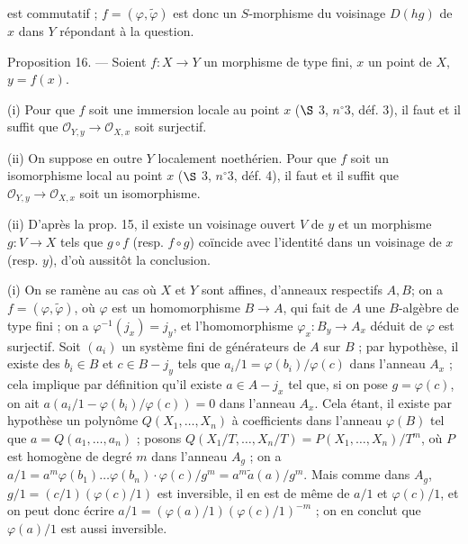 \newpage


est commutatif ; $f = (\varphi, \tilde{\varphi})$ est donc un $S$-morphisme du voisinage $D(hg)$ de $x$ dans $Y$ répondant à la question.

Proposition 16. — Soient $f: X \to Y$ un morphisme de type fini, $x$ un point de $X$, $y = f(x)$.

(i) Pour que $f$ soit une immersion locale au point $x$ ($\S$ 3, $n^\circ 3$, déf. 3), il faut et il suffit que $\mathcal{O}_{Y,y} \to \mathcal{O}_{X,x}$ soit surjectif.

(ii) On suppose en outre $Y$ localement noethérien. Pour que $f$ soit un isomorphisme local au point $x$ ($\S$ 3, $n^\circ 3$, déf. 4), il faut et il suffit que $\mathcal{O}_{Y,y} \to \mathcal{O}_{X,x}$ soit un isomorphisme.

(ii) D'après la prop. 15, il existe un voisinage ouvert $V$ de $y$ et un morphisme $g: V \to X$ tels que $g \circ f$ (resp. $f \circ g$) coïncide avec l'identité dans un voisinage de $x$ (resp. $y$), d'où aussitôt la conclusion.

(i) On se ramène au cas où $X$ et $Y$ sont affines, d'anneaux respectifs $A, B$; on a $f = (\varphi, \tilde{\varphi})$, où $\varphi$ est un homomorphisme $B \to A$, qui fait de $A$ une $B$-algèbre de type fini ; on a $\varphi^{-1}(j_x) = j_y$, et l'homomorphisme $\varphi_x : B_y \to A_x$ déduit de $\varphi$ est surjectif. Soit $(a_i)$ un système fini de générateurs de $A$ sur $B$ ; par hypothèse, il existe des $b_i \in B$ et $c \in B - j_y$ tels que $a_i/1 = \varphi(b_i)/\varphi(c)$ dans l'anneau $A_x$ ; cela implique par définition qu'il existe $a \in A - j_x$ tel que, si on pose $g = \varphi(c)$, on ait $a(a_i/1 - \varphi(b_i)/\varphi(c)) = 0$ dans l'anneau $A_x$. Cela étant, il existe par hypothèse un polynôme $Q(X_1, \dots, X_n)$ à coefficients dans l'anneau $\varphi(B)$ tel que $a = Q(a_1, \dots, a_n)$ ; posons $Q(X_1/T, \dots, X_n/T) = P(X_1, \dots, X_n)/T^m$, où $P$ est homogène de degré $m$ dans l'anneau $A_g$ ; on a $a/1 = a^m \varphi(b_1) \dots \varphi(b_n) \cdot \varphi(c) / g^m = a^m \tilde{a}(a) / g^m$. Mais comme dans $A_g$, $g/1 = (c/1)(\varphi(c)/1)$ est inversible, il en est de même de $a/1$ et $\varphi(c)/1$, et on peut donc écrire $a/1 = (\varphi(a)/1)(\varphi(c)/1)^{-m}$ ; on en conclut que $\varphi(a)/1$ est aussi inversible.

